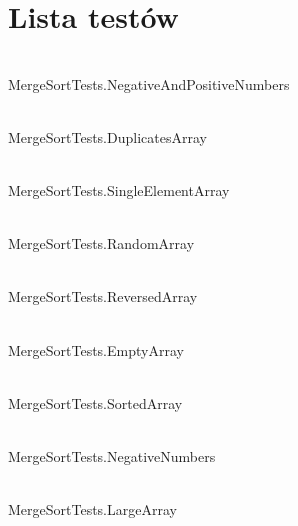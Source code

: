 \chapter{Lista testów}
\hypertarget{test}{}\label{test}

\begin{DoxyRefList}
\item[Składowa \doxylink{testdoduje_8cpp_abd364edbfed8dbdf73454079ddb1b753}{TEST} (Merge\+Sort\+Tests, Negative\+And\+Positive\+Numbers)]\hfill \\
\label{test__test000001}%
%
Merge\+Sort\+Tests.\+Negative\+And\+Positive\+Numbers  
\item[Składowa \doxylink{testduplikat_8cpp_a49ca750662b44d9a46523f7e91d97d20}{TEST} (Merge\+Sort\+Tests, Duplicates\+Array)]\hfill \\
\label{test__test000002}%
%
Merge\+Sort\+Tests.\+Duplicates\+Array  
\item[Składowa \doxylink{testjeden_8cpp_a8f5b91e8385d5e5507ccd5566077ce4f}{TEST} (Merge\+Sort\+Tests, Single\+Element\+Array)]\hfill \\
\label{test__test000003}%
%
Merge\+Sort\+Tests.\+Single\+Element\+Array  
\item[Składowa \doxylink{testlosowy_8cpp_ae634a5443c1651532461b0ebe4380d61}{TEST} (Merge\+Sort\+Tests, Random\+Array)]\hfill \\
\label{test__test000004}%
%
Merge\+Sort\+Tests.\+Random\+Array  
\item[Składowa \doxylink{testodwrotny_8cpp_a6e0994f44ed4eabb5aba7b552f24372c}{TEST} (Merge\+Sort\+Tests, Reversed\+Array)]\hfill \\
\label{test__test000005}%
%
Merge\+Sort\+Tests.\+Reversed\+Array  
\item[Składowa \doxylink{testpusty_8cpp_a087bd2fb35f6d6ff4627bed20334dee6}{TEST} (Merge\+Sort\+Tests, Empty\+Array)]\hfill \\
\label{test__test000006}%
%
Merge\+Sort\+Tests.\+Empty\+Array  
\item[Składowa \doxylink{_testsortowania_8cpp_a5d4488dd95ea7ba5098c810cb3176d0e}{TEST} (Merge\+Sort\+Tests, Sorted\+Array)]\hfill \\
\label{test__test000007}%
%
Merge\+Sort\+Tests.\+Sorted\+Array  
\item[Składowa \doxylink{testujemny_8cpp_a90d1421780f84a8c9aa05c7c8207d79e}{TEST} (Merge\+Sort\+Tests, Negative\+Numbers)]\hfill \\
\label{test__test000008}%
%
Merge\+Sort\+Tests.\+Negative\+Numbers  
\item[Składowa \doxylink{testwiekszy_8cpp_ab560655c7724de98bc956634942da06e}{TEST} (Merge\+Sort\+Tests, Large\+Array)]\hfill \\
\label{test__test000009}%
%
Merge\+Sort\+Tests.\+Large\+Array 
\end{DoxyRefList}